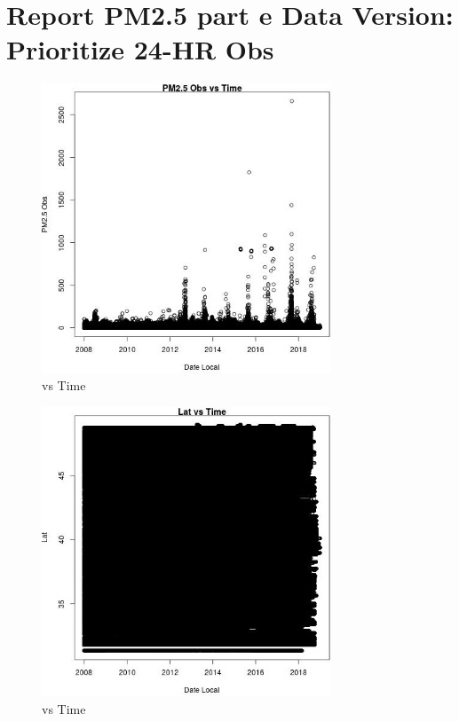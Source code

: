 
\section{Report PM2.5 part e Data Version: Prioritize 24-HR Obs} 
 

\begin{figure} 
\centering  
\includegraphics[width=0.77\textwidth]{Code_Outputs/Report_PM25_Step4_part_e_de_duplicated_aves_prioritize_24hr_obs_ML_input_PM25_ObsvDate_Local.jpg} 
\caption{\label{fig:Report_PM25_Step4_part_e_de_duplicated_aves_prioritize_24hr_obs_ML_inputPM25_ObsvDate_Local}vs Time} 
\end{figure} 
 

\begin{figure} 
\centering  
\includegraphics[width=0.77\textwidth]{Code_Outputs/Report_PM25_Step4_part_e_de_duplicated_aves_prioritize_24hr_obs_ML_input_LatvDate_Local.jpg} 
\caption{\label{fig:Report_PM25_Step4_part_e_de_duplicated_aves_prioritize_24hr_obs_ML_inputLatvDate_Local}vs Time} 
\end{figure} 
 

